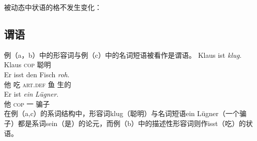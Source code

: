 被动态中状语的格不发生变化：
\eal
{}
\zl
{}

\subsection{谓语}
例（a，b）中的形容词与例（c）中的名词短语被看作是谓语。
\eal
\ex 
\gll Klaus ist \emph{klug}.\\
	 Klaus \textsc{cop} 聪明\\
\ex 
\gll Er isst den Fisch \emph{roh}.\\
	 他 吃 \textsc{art}.\textsc{def} 鱼 生的\\
\ex 
\gll Er ist \emph{ein} \emph{Lügner}.\\
     他 \textsc{cop} 一 骗子\\
\zl
在例（a,c）的系词结构中，形容词klug（聪明）与名词短语ein Lügner（一个骗子）都是系词sein（是）的论元，而例（b）中的描述性形容词则作isst（吃）的状语。

